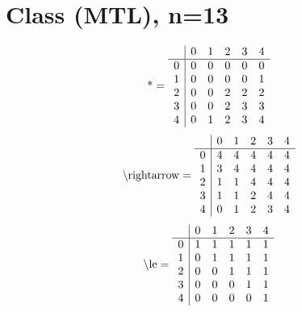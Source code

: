 \documentclass[11pt]{article}
\begin{document}
\section{Class (MTL), n=13}
\[\text{*} = 
\begin{array}{r | r r r r r}
 & 0 & 1 & 2 & 3 & 4 \\ \hline
0 & 0 & 0 & 0 & 0 & 0 \\
1 & 0 & 0 & 0 & 0 & 1 \\
2 & 0 & 0 & 2 & 2 & 2 \\
3 & 0 & 0 & 2 & 3 & 3 \\
4 & 0 & 1 & 2 & 3 & 4 \\
\end{array}
\]
\[\text{\textbackslash rightarrow} = 
\begin{array}{r | r r r r r}
 & 0 & 1 & 2 & 3 & 4 \\ \hline
0 & 4 & 4 & 4 & 4 & 4 \\
1 & 3 & 4 & 4 & 4 & 4 \\
2 & 1 & 1 & 4 & 4 & 4 \\
3 & 1 & 1 & 2 & 4 & 4 \\
4 & 0 & 1 & 2 & 3 & 4 \\
\end{array}
\]
\[\text{\textbackslash le} = 
\begin{array}{r | r r r r r}
 & 0 & 1 & 2 & 3 & 4 \\ \hline
0 & 1 & 1 & 1 & 1 & 1 \\
1 & 0 & 1 & 1 & 1 & 1 \\
2 & 0 & 0 & 1 & 1 & 1 \\
3 & 0 & 0 & 0 & 1 & 1 \\
4 & 0 & 0 & 0 & 0 & 1 \\
\end{array}
\]
\end{document}
